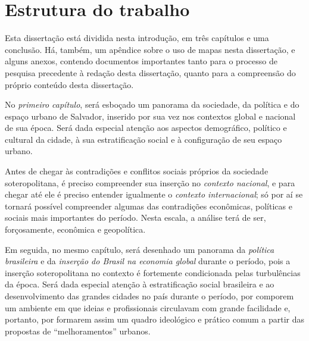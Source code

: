 \section[Estrutura do trabalho]{Estrutura do trabalho}\label{sec:estrutrab}

Esta dissertação está dividida nesta introdução, em três capítulos e uma conclusão. Há, também, 
um apêndice sobre o uso de mapas nesta dissertação, e alguns anexos, contendo documentos importantes tanto para o processo de pesquisa precedente à redação desta dissertação, quanto para a compreensão do próprio conteúdo desta dissertação.

No \textit{primeiro capítulo}, será esboçado um panorama da sociedade, da política e do espaço urbano de Salvador, inserido por sua vez nos contextos global e nacional de sua época. Será dada especial atenção aos aspectos demográfico, político e cultural da cidade, à sua estratificação social e à configuração de seu espaço urbano. 

Antes de chegar às contradições e conflitos sociais próprios da sociedade soteropolitana, é preciso compreender sua inserção no \textit{contexto nacional}, e para chegar até ele é preciso entender igualmente o \textit{contexto internacional}; só por aí se tornará possível compreender algumas das contradições econômicas, políticas e sociais mais importantes do período. Nesta escala, a análise terá de ser, forçosamente, econômica e geopolítica. 

Em seguida, no mesmo capítulo, será desenhado um panorama da \textit{política brasileira} e da \textit{inserção do Brasil na economia global} durante o período, pois a inserção soteropolitana no contexto é fortemente condicionada pelas turbulências da época. Será dada especial atenção à estratificação social brasileira e ao desenvolvimento das grandes cidades no país durante o período, por comporem um ambiente em que ideias e profissionais circulavam com grande facilidade e, portanto, por formarem assim um quadro ideológico e prático comum a partir das propostas de ``melhoramentos'' urbanos. 

